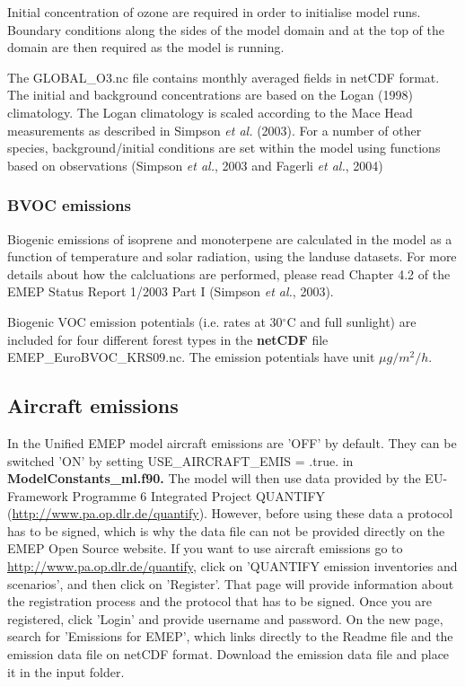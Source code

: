 Initial concentration of ozone are required in order to
initialise model runs. Boundary conditions along the sides of the model
domain and at the top of the domain are then required as the model is
running.

The GLOBAL\_O3.nc file contains monthly averaged fields in netCDF format. 
The initial and background
concentrations are based on the Logan (1998) climatology. The Logan
climatology is scaled according to the Mace Head measurements as
described in Simpson {\sl et al.} (2003). For a number of other species, 
background/initial conditions are set within the model using functions 
based on observations (Simpson {\sl et al.}, 2003 and Fagerli {\sl et al.}, 2004)



\subsubsection{BVOC emissions}

Biogenic emissions of isoprene and monoterpene are calculated in the model as a function of temperature 
and solar radiation, using the landuse datasets.  For more details about how the
calcluations are performed, please read Chapter 4.2 of the EMEP
Status Report 1/2003 Part I (Simpson {\sl et al.}, 2003).

Biogenic VOC emission potentials (i.e. rates at 30$^\circ$C and full sunlight)
are included for four different forest types in the {\bf netCDF } file \\
EMEP\_EuroBVOC\_KRS09.nc. 
The emission potentials have unit $\mu g/m^{2} /h$.






\subsection{Aircraft emissions}
In the Unified EMEP model aircraft emissions are 'OFF' by default. 
They can be switched 'ON' by setting USE\_AIRCRAFT\_EMIS = .true. in { \bf ModelConstants\_ml.f90.} 
The model will then use data provided by the EU-Framework Programme 6 Integrated 
Project QUANTIFY (\url{http://www.pa.op.dlr.de/quantify}). However, before using 
these data a protocol has to be signed, which is why the data file can not be provided 
directly on the EMEP Open Source website. If you want to use aircraft emissions go to 
\url{http://www.pa.op.dlr.de/quantify}, click on 'QUANTIFY emission inventories and scenarios', 
and then click on 'Register'. That page will provide information about the registration 
process and the protocol that has to be signed. Once you are registered, click 'Login' and 
provide username and password. On the new page, search for 'Emissions for EMEP', which 
links directly to the Readme file and the emission data file on netCDF format. Download the 
emission data file and place it in the input folder.

